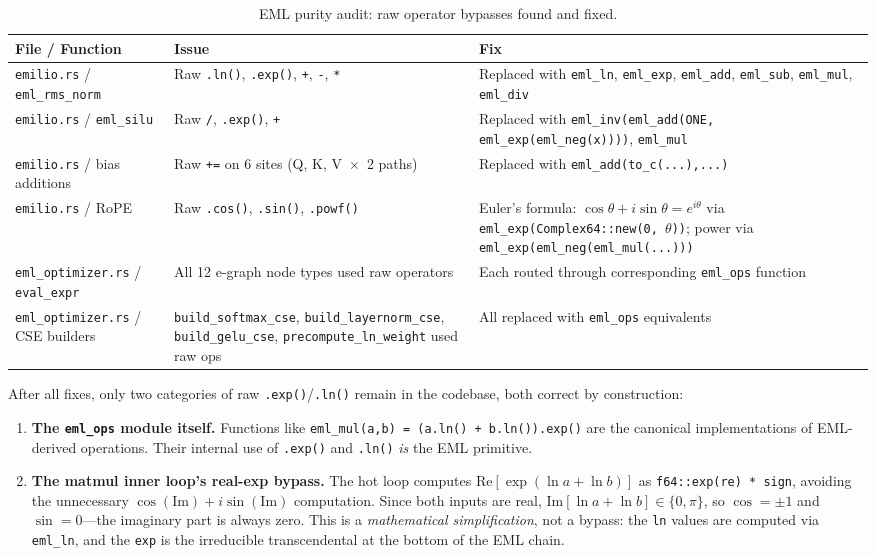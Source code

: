 \documentclass[acmsmall,nonacm]{acmart}
\begin{document}
\begin{table}[h]
\caption{EML purity audit: raw operator bypasses found and fixed.}
\label{tab:audit}
\centering
\small
\begin{tabular}{llp{5.1cm}}
\toprule
\textbf{File / Function} & \textbf{Issue} & \textbf{Fix} \\
\midrule
\texttt{emilio.rs} / \texttt{eml\_rms\_norm}
  & Raw \texttt{.ln()}, \texttt{.exp()}, \texttt{+}, \texttt{-}, \texttt{*}
  & Replaced with \texttt{eml\_ln}, \texttt{eml\_exp}, \texttt{eml\_add}, \texttt{eml\_sub}, \texttt{eml\_mul}, \texttt{eml\_div} \\[3pt]
\texttt{emilio.rs} / \texttt{eml\_silu}
  & Raw \texttt{/}, \texttt{.exp()}, \texttt{+}
  & Replaced with \texttt{eml\_inv(eml\_add(ONE, eml\_exp(eml\_neg(x))))}, \texttt{eml\_mul} \\[3pt]
\texttt{emilio.rs} / bias additions
  & Raw \texttt{+=} on 6 sites (Q, K, V~$\times$~2 paths)
  & Replaced with \texttt{eml\_add(to\_c(...),...)} \\[3pt]
\texttt{emilio.rs} / RoPE
  & Raw \texttt{.cos()}, \texttt{.sin()}, \texttt{.powf()}
  & Euler's formula: $\cos\theta + i\sin\theta = e^{i\theta}$ via \texttt{eml\_exp(Complex64::new(0, $\theta$))}; power via \texttt{eml\_exp(eml\_neg(eml\_mul(...)))} \\[3pt]
\texttt{eml\_optimizer.rs} / \texttt{eval\_expr}
  & All 12 e-graph node types used raw operators
  & Each routed through corresponding \texttt{eml\_ops} function \\[3pt]
\texttt{eml\_optimizer.rs} / CSE builders
  & \texttt{build\_softmax\_cse}, \texttt{build\_layernorm\_cse}, \texttt{build\_gelu\_cse}, \texttt{precompute\_ln\_weight} used raw ops
  & All replaced with \texttt{eml\_ops} equivalents \\
\bottomrule
\end{tabular}
\end{table}

After all fixes, only two categories of raw \texttt{.exp()}/\texttt{.ln()}
remain in the codebase, both correct by construction:
\begin{enumerate}
\item \textbf{The \texttt{eml\_ops} module itself.}  Functions like
  \texttt{eml\_mul(a,b) = (a.ln() + b.ln()).exp()} are the canonical
  implementations of EML-derived operations.  Their internal use of
  \texttt{.exp()} and \texttt{.ln()} \emph{is} the EML primitive.
\item \textbf{The matmul inner loop's real-exp bypass.}  The hot loop
  computes $\mathrm{Re}[\exp(\ln a + \ln b)]$ as
  \texttt{f64::exp(re) * sign}, avoiding the unnecessary
  $\cos(\mathrm{Im}) + i\sin(\mathrm{Im})$ computation.  Since both
  inputs are real, $\mathrm{Im}[\ln a + \ln b] \in \{0, \pi\}$, so
  $\cos = \pm1$ and $\sin = 0$---the imaginary part is always zero.
  This is a \emph{mathematical simplification}, not a bypass: the
  \texttt{ln} values are computed via \texttt{eml\_ln}, and the
  \texttt{exp} is the irreducible transcendental at the bottom of the
  EML chain.
\end{enumerate}
\end{document}
